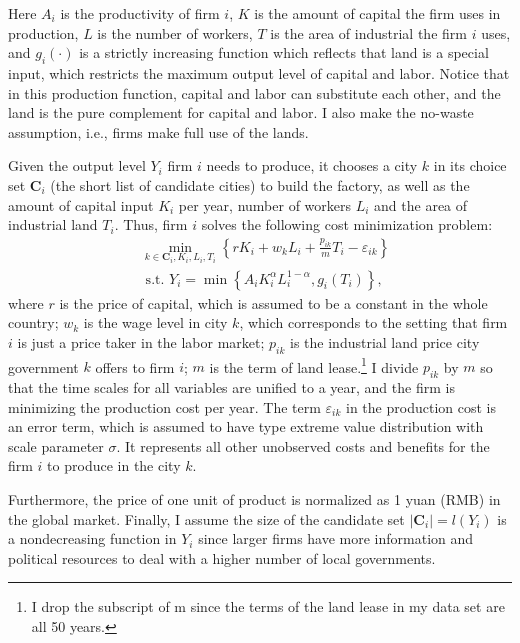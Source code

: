 Here $A_i$ is the productivity of firm $i$,
$K$ is the amount of capital the firm uses in production,
$L$ is the number of workers,
$T$ is the area of industrial the firm $i$ uses,
and $g_i(\cdot)$ is a strictly increasing function which reflects that land is
a special input, which restricts the maximum output level of capital and labor.
Notice that in this production function, capital and labor can substitute each other, and
the land is the pure complement for capital and labor.
I also make the no-waste assumption, i.e., firms make full use of the lands.

Given the output level $Y_i$ firm $i$ needs to produce,
it chooses a city $k$ in its choice set
$\mathbf{C}_{i}$ (the short list of candidate cities) to build the factory,
as well as the amount of capital input $K_i$ per year,
number of workers $L_i$ and the area of industrial land $T_i$.
Thus, firm $i$ solves the following cost minimization problem:
\begin{equation}
    \begin{aligned}
         & \min _{k \in \mathbf{C}_{i}, K_{i}, L_{i}, T_{i}}
        \left\{r K_{i}+w_{k} L_{i}+\frac{p_{i k}}{m} T_{i}-\varepsilon_{i k}\right\}     \\
         & \text { s.t. } Y_{i}=\min \left\{A_{i} K_{i}^{\alpha} L_{i}^{1-\alpha}, g_{i}
        \left(T_{i}\right)\right\},
    \end{aligned}
    \label{firm_minimization1}
\end{equation}
where $r$ is the price of capital, which is assumed to be a constant in the whole country;
$w_k$ is the wage level in city $k$, which corresponds to the setting that
firm $i$ is just a price taker in the labor market;
$p_{ik}$ is the industrial land price city government $k$
offers to firm $i$; $m$ is the term of land lease.\footnote{
    I drop the subscript of m since
    the terms of the land lease in my data set are all 50 years.}
I divide $p_{ik}$ by $m$ so that the time scales for all variables are unified to a year,
and the firm is minimizing the production cost per year.
The term $\varepsilon_{ik}$ in the production
cost is an error term, which is assumed to have
type  extreme value distribution with scale parameter $\sigma$.
It represents all other unobserved costs and benefits for the firm $i$ to
produce in the city $k$.

Furthermore, the price of one unit of product is normalized as 1 yuan (RMB) in the global market.
Finally, I assume the size of the candidate set $|\mathbf{C}_i| = l(Y_i)$ is a
nondecreasing function in $Y_i$ since larger firms have more information and political
resources to deal with a higher number of local governments.

